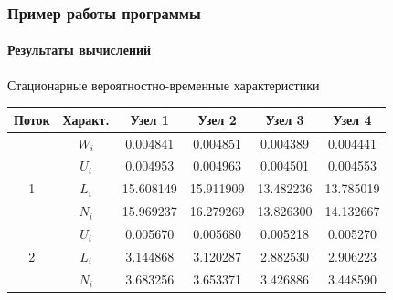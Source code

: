 \documentclass[aspectratio=43]{beamer}
\begin{document}
\begin{frame}
\frametitle{Пример работы программы}
\framesubtitle{Результаты вычислений}

\begin{block}{Стационарные вероятностно-временные характеристики}
\begin{tabular}{|c|c|c|c|c|c|}
\hline Поток & Характ. & Узел 1 & Узел 2 & Узел 3 & Узел 4 \\
\hline \cellcolor{black} 	& \( W_{i} \) & 0.004841 & 0.004851 & 0.004389 & 0.004441 \\

\hline \multirow{3}{*}{1} 	& \( U_{i} \) & 0.004953 & 0.004963 & 0.004501 & 0.004553 \\
\hhline{~-----} 				& \( L_{i} \) & 15.608149 & 15.911909 & 13.482236 & 13.785019 \\
\hhline{~-----}				& \( N_{i} \) & 15.969237 & 16.279269 & 13.826300 & 14.132667 \\

\hline \multirow{3}{*}{2} 	& \( U_{i} \) & 0.005670 & 0.005680 & 0.005218 & 0.005270 \\
\hhline{~-----} 				& \( L_{i} \) & 3.144868 & 3.120287 & 2.882530 & 2.906223 \\
\hhline{~-----}				& \( N_{i} \) & 3.683256 & 3.653371 & 3.426886 & 3.448590 \\
\hline
\end{tabular}
\end{block}
\end{frame}
\end{document}
